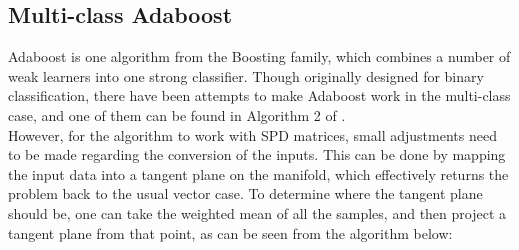 \documentclass[12pt]{article}
\begin{document}
\begin{sloppypar}
\subsection{Multi-class Adaboost}
Adaboost is one algorithm from the Boosting \cite{Boosting} family, which combines a number of weak learners into one strong classifier. Though originally designed for binary classification, there have been attempts to make Adaboost work in the multi-class case, and one of them can be found in Algorithm 2 of \cite{Adaboost}. \\
However, for the algorithm to work with SPD matrices, small adjustments need to be made regarding the conversion of the inputs. This can be done by mapping the input data into a tangent plane on the manifold, which effectively returns the problem back to the usual vector case. To determine where the tangent plane should be, one can take the weighted mean of all the samples, and then project a tangent plane from that point, as can be seen from the algorithm below: \\


\end{sloppypar}
\end{document}
